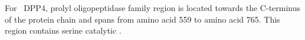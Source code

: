 For~ DPP4, prolyl oligopeptidase family region is located towards the C-terminus of the protein chain and spans from amino acid 559 to amino acid 765. This region contains serine catalytic .  